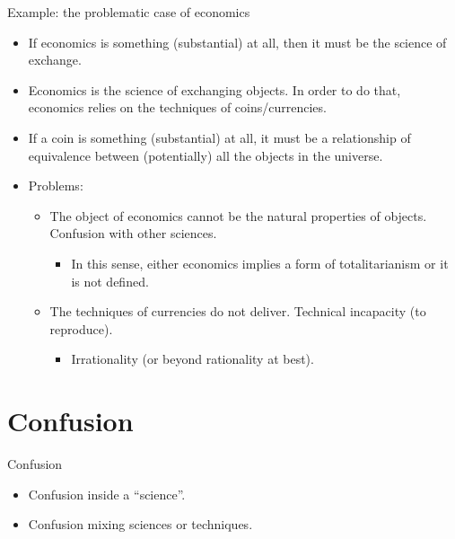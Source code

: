 \documentclass{beamer}
\begin{document}
\begin{frame}{Example: the problematic case of economics}

  \begin{itemize}
  \item If economics is something (substantial) at all, then it must be the science of exchange.
  \item Economics is the science of exchanging objects. In order to do that, economics relies on the techniques of coins/currencies.
  \item If a coin is something (substantial) at all, it must be a relationship of equivalence between (potentially) all the objects in the universe.
  \item Problems:
  	\begin{itemize}
  	\item The object of economics cannot be the natural properties of objects. Confusion with other sciences.
  		\begin{itemize}
  		\item In this sense, either economics implies a form of totalitarianism or it is not defined.
  		\end{itemize}
  	\item The techniques of currencies do not deliver. Technical incapacity (to reproduce).
  		\begin{itemize}
  		\item Irrationality (or beyond rationality at best).
  		\end{itemize}
  	\end{itemize}
  \end{itemize}
\end{frame}

\section{Confusion}

\begin{frame}{Confusion}

\begin{itemize}
\item Confusion inside a ``science''.
\item Confusion mixing sciences or techniques.
\end{itemize}
\end{frame}
\end{document}
